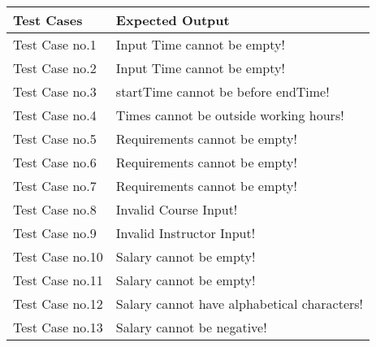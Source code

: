 \documentclass[12pt]{report}
\begin{document}
	\begin{flushleft}
		\begin{tabular}{ | l | l | }
			\hline
			Test Cases & Expected Output \\ \hline
			Test Case no.1 & Input Time cannot be empty! \\ \hline
			Test Case no.2 & Input Time cannot be empty! \\ \hline
			Test Case no.3 & startTime cannot be before endTime! \\ \hline
			Test Case no.4 & Times cannot be outside working hours! \\ \hline
			Test Case no.5 & Requirements cannot be empty! \\ \hline
			Test Case no.6 & Requirements cannot be empty! \\ \hline
			Test Case no.7 & Requirements cannot be empty! \\ \hline
			Test Case no.8 & Invalid Course Input! \\ \hline
			Test Case no.9 & Invalid Instructor Input! \\ \hline
			Test Case no.10 & Salary cannot be empty! \\ \hline
			Test Case no.11 & Salary cannot be empty! \\ \hline
			Test Case no.12 & Salary cannot have alphabetical characters! \\ \hline
			Test Case no.13 & Salary cannot be negative! \\ \hline
			
		\end{tabular}
	\end{flushleft}
\end{document}
